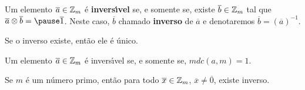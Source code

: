 \documentclass{beamer}
\begin{document}
    \begin{frame}
        \begin{definicao}
            Um elemento $\overline{a} \in \mathbb{Z}_m$ {\'e} \textbf{invers{\'\i}vel} \pause se, e somente se, existe $\overline{b} \in \mathbb{Z}_m$ \pause tal que $\overline{a} \otimes \overline{b} = \pause \overline{1}$. \pause Neste caso, $\overline{b}$  chamado \textbf{inverso} de $\overline{a}$ \pause e denotaremos $\overline{b} = (\overline{a})^{-1}$.\pause
        \end{definicao}

        \begin{proposicao}
            Se o inverso existe, \pause ent\~ao ele {\'e} {\'u}nico.
        \end{proposicao}
    \end{frame}

    \begin{frame}
        \begin{proposicao}
            Um elemento $\overline{a} \in \mathbb{Z}_m$ {\'e} \pause invers{\'\i}vel \pause se, e somente se, $mdc(a,m) = 1$.\pause
        \end{proposicao}

        \begin{corolario}
            Se $m$ \'e um n\'umero primo, \pause ent\~ao para todo $\overline{x} \in \mathbb{Z}_m$, \pause $\overline{x} \ne \overline{0}$, \pause existe inverso.
        \end{corolario}
    \end{frame}
\end{document}
